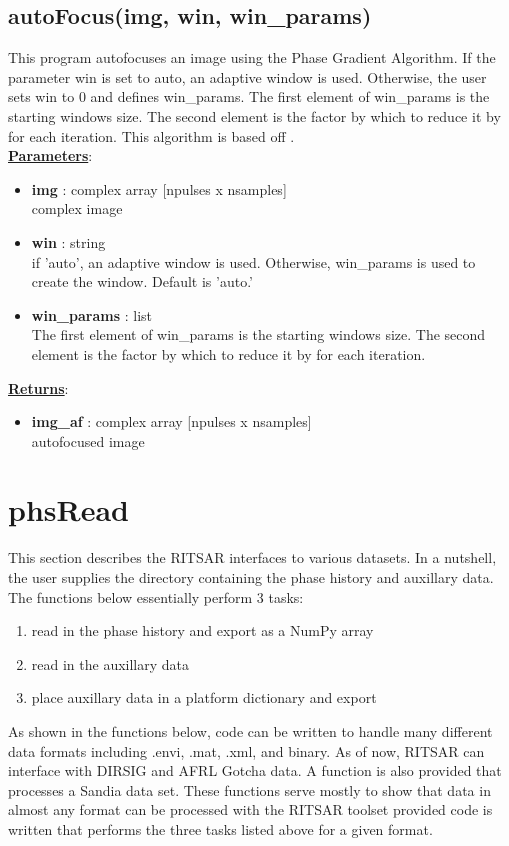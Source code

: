 \documentclass{article}
\newcommand{\defs}[2]{\textbf{{#1}} : {#2}}
\begin{document}
\subsection{autoFocus(img, win, win\_params)}
This program autofocuses an image using the Phase Gradient Algorithm.  If the parameter win is set to auto, an adaptive window is used.  Otherwise, the user sets win to 0 and defines win\_params.  The first element of win\_params is the starting windows size.  The second element is the factor by which to reduce it by for each iteration.  This algorithm is based off \cite{303752}.\\

\noindent \underline{\textbf{Parameters}}:

\begin{itemize}
	\item \defs{img}{complex array [npulses x nsamples]}\\
  		complex image
  	\item \defs{win}{string}\\
  		if 'auto', an adaptive window is used.  Otherwise, win\_params is used to create the window.  Default is 'auto.'
  	\item \defs{win\_params}{list}\\
  	  		The first element of win\_params is the starting windows size.  The second element is the factor by which to reduce it by for each iteration.
  	
\end{itemize}

\noindent \underline{\textbf{Returns}}:
\begin{itemize}
	\item \defs{img\_af}{complex array [npulses x nsamples]}\\
	autofocused image
\end{itemize}

\newpage
\section{phsRead}
This section describes the RITSAR interfaces to various datasets.  In a nutshell, the user supplies the directory containing the phase history and auxillary data.  The functions below essentially perform 3 tasks:
\begin{enumerate}
\item read in the phase history and export as a NumPy array
\item read in the auxillary data
\item place auxillary data in a platform dictionary and export
\end{enumerate}
As shown in the functions below, code can be written to handle many different data formats including .envi, .mat, .xml, and binary.  As of now, RITSAR can interface with DIRSIG and AFRL Gotcha data.  A function is also provided that processes a Sandia data set.  These functions serve mostly to show that data in almost any format can be processed with the RITSAR toolset provided code is written that performs the three tasks listed above for a given format.
\end{document}

